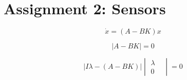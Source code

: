 \documentclass[final]{scrreprt} %
\begin{document}
\chapter{Assignment 2: Sensors}
\label{ch:mod2-ass2}
\begin{equation}
	\dot{x} = (A - BK)x
	\label{eq:total}
\end{equation}

\begin{equation}
	\left| A - BK \right| = 0
	\label{eq:char_eq}
\end{equation}

\begin{equation}
	\left| I \lambda - (A - BK) \right|
	\begin{vmatrix}
		\lambda &   \\
		0 & 
	\end{vmatrix} = 0
	\label{eq:char_eq_matrix}
\end{equation}
\end{document}
